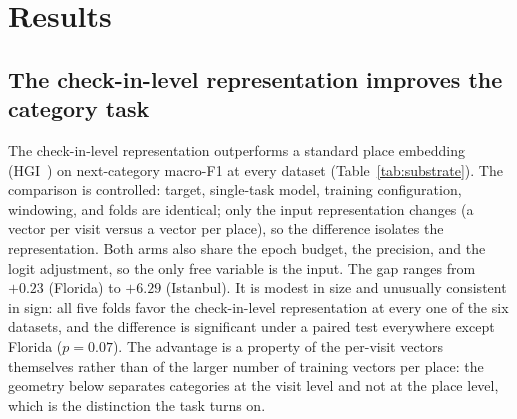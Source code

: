 \section{Results}
\label{sec:results}

\subsection{The check-in-level representation improves the category task}
\label{sec:results-part1}
The check-in-level representation outperforms a standard place embedding
(HGI~\cite{huang2023hgi}) on next-category macro-F1 at every dataset
(Table~\ref{tab:substrate}). The comparison is controlled: target, single-task model, training configuration, windowing, and folds are identical; only the input representation changes (a vector per visit versus a vector per place), so the difference isolates the representation. Both arms also share the epoch budget, the precision, and the logit adjustment, so the only free variable is the input. The gap ranges from $+0.23$ (Florida) to $+6.29$ (Istanbul). It is modest in size and unusually consistent in sign: all five folds favor the check-in-level representation at every one of the six datasets, and the difference is significant under a paired test everywhere except Florida ($p=0.07$).
The advantage is a property of the per-visit vectors themselves rather than of the larger number of training vectors per place: the geometry below separates categories at the visit level and not at the place level, which is the distinction the task turns on.

